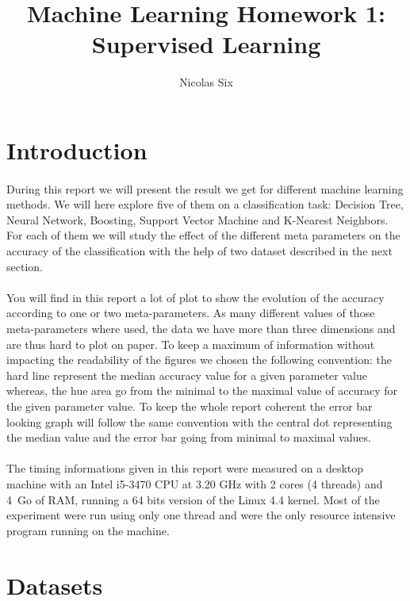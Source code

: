 \documentclass[twocolumn,a4paper,10pt]{article}
\title{Machine Learning Homework 1:\\Supervised Learning}
\author{Nicolas Six}
\begin{document}
\maketitle
\tableofcontents

\section{Introduction}
\paragraph{}
During this report we will present the result we get for different machine learning methods. We will here explore five of them on a classification task: Decision Tree, Neural Network, Boosting, Support Vector Machine and K-Nearest Neighbors. For each of them we will study the effect of the different meta parameters on the accuracy of the classification with the help of two dataset described in the next section.
\paragraph{}
You will find in this report a lot of plot to show the evolution of the accuracy according to one or two meta-parameters. As many different values of those meta-parameters where used, the data we have more than three dimensions and are thus hard to plot on paper. To keep a maximum of information without impacting the readability of the figures we chosen the following convention: the hard line represent the median accuracy value for a given parameter value whereas, the hue area go from the minimal to the maximal value of accuracy for the given parameter value. To keep the whole report coherent the error bar looking graph will follow the same convention with the central dot representing the median value and the error bar going from minimal to maximal values.
\paragraph{}
The timing informations given in this report were measured on a desktop machine with an Intel i5-3470 CPU at 3.20 GHz with 2 cores (4 threads) and 4~Go of RAM, running a 64 bits version of the Linux 4.4 kernel. Most of the experiment were run using only one thread and were the only resource intensive program running on the machine.

\section{Datasets}
\end{document}
